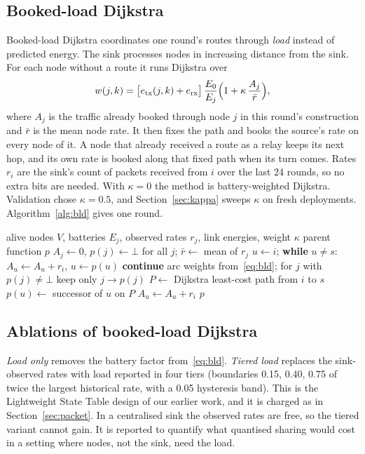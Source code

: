 \subsection{Booked-load Dijkstra}\label{sec:bld}
Booked-load Dijkstra coordinates one round's routes through \emph{load} instead of predicted energy. The sink processes nodes in increasing distance from the sink. For each node without a route it runs Dijkstra over
\begin{equation}
w(j,k)=\bigl[e_{\mathrm{tx}}(j,k)+e_{\mathrm{rx}}\bigr]\,\frac{E_0}{E_j}\Bigl(1+\kappa\,\frac{A_j}{\bar r}\Bigr),\label{eq:bld}
\end{equation}
where $A_j$ is the traffic already booked through node $j$ in this round's construction and $\bar r$ is the mean node rate. It then fixes the path and books the source's rate on every node of it. A node that already received a route as a relay keeps its next hop, and its own rate is booked along that fixed path when its turn comes. Rates $r_i$ are the sink's count of packets received from $i$ over the last 24 rounds, so no extra bits are needed. With $\kappa=0$ the method is battery-weighted Dijkstra. Validation chose $\kappa=0.5$, and Section~\ref{sec:kappa} sweeps $\kappa$ on fresh deployments. Algorithm~\ref{alg:bld} gives one round.

\begin{algorithm}[t]
\caption{Booked-load Dijkstra: one round at the sink}\label{alg:bld}
\small
\begin{algorithmic}[1]
\Require alive nodes $V$, batteries $E_j$, observed rates $r_j$, link energies, weight $\kappa$
\Ensure parent function $p$
\State $A_j\gets0$, $p(j)\gets\bot$ for all $j$; $\bar r\gets$ mean of $r_j$
    \State $u\gets i$; \textbf{while} $u\ne s$: $A_u\gets A_u+r_i$, $u\gets p(u)$ 
    \State \textbf{continue}
  \EndIf
  \State arc weights from~\eqref{eq:bld}; for $j$ with $p(j)\ne\bot$ keep only $j\to p(j)$
  \State $P\gets$ Dijkstra least-cost path from $i$ to $s$
     $p(u)\gets$ successor of $u$ on $P$ \EndIf
    \State $A_u\gets A_u+r_i$
  \EndFor
\EndFor
\State \Return $p$
\end{algorithmic}
\end{algorithm}

\subsection{Ablations of booked-load Dijkstra}\label{sec:lest}
\emph{Load only} removes the battery factor from~\eqref{eq:bld}. \emph{Tiered load} replaces the sink-observed rates with load reported in four tiers (boundaries 0.15, 0.40, 0.75 of twice the largest historical rate, with a 0.05 hysteresis band). This is the Lightweight State Table design of our earlier work, and it is charged as in Section~\ref{sec:packet}. In a centralised sink the observed rates are free, so the tiered variant cannot gain. It is reported to quantify what quantised sharing would cost in a setting where nodes, not the sink, need the load.

